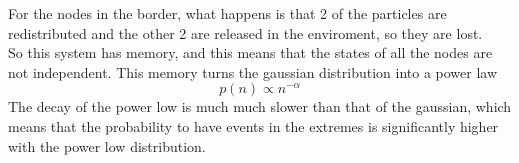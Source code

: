 For the nodes in the border, what happens is that 2 of the particles are redistributed and the other 2 are released in the enviroment, so they are lost. \\
So this system has memory, and this means that the states of all the nodes are not independent. This memory turns the gaussian distribution into a power law
$$
	p(n) \propto n^{-\alpha}
$$
The decay of the power low is much much slower than that of the gaussian, which means that the probability to have events in the extremes is significantly higher with the power low distribution.
